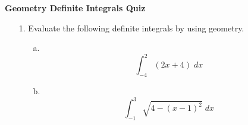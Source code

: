 \documentclass[11pt]{article}
\begin{document}
	
	
	
	
	\centerline{\textbf{\Large{Geometry Definite Integrals Quiz}}}
	
	\vspace{0.2in}
	
	
	\begin{enumerate}
		
		\item[1.]Evaluate the following definite integrals by using geometry.
		\begin{enumerate}
			\item[a.] $$ \int_{-4}^{2} (2x + 4) \; dx$$ 
			\vspace{8cm}
			\item[b.] $$\int_{-1}^{3} \sqrt{4 - (x - 1)^2} \; dx$$
		\end{enumerate}
		
	\end{enumerate}
	
	
	
	
	
	
	
	
\end{document}
